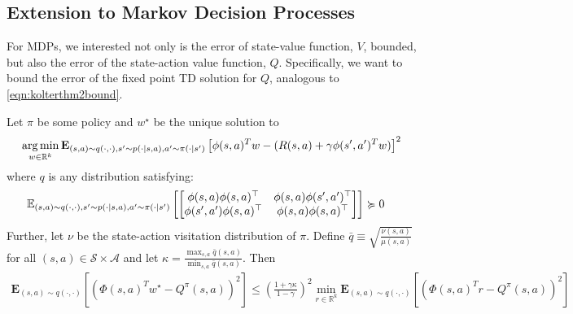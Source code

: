 \subsection{Extension to Markov Decision Processes}
\label{app:pop-q-derivation}
For MDPs, we interested not only is the error of state-value function, $V$, bounded, but also the error of the state-action value function, $Q$.
Specifically, we want to bound the error of the fixed point TD solution for $Q$, analogous to \cref{eqn:kolterthm2bound}.
\begin{lemma}
  Let $\pi$ be some policy and $w^{\star}$ be the unique solution to
  \begin{align}
    \operatorname*{arg\,min}_{w \in \mathbb{R}^k} \mathbf{E}_{(s,a) \sim q(\cdot, \cdot), s' \sim p(\cdot|s,a), a'\sim \pi(\cdot|s')} \left[ \phi(s,a)^T w - (R(s, a) + \gamma \phi(s',a')^T w) \right]^2
  \end{align}
  where $q$ is any distribution satisfying:
  \begin{align}
    \mathbb{E}_{(s, a) \sim q(\cdot, \cdot), s'\sim p(\cdot|s, a), a' \sim \pi(\cdot|s')} & \left[\begin{bmatrix}
                                                                                              \phi(s, a)\phi(s, a)^\top   & \phi(s, a)\phi(s', a')^\top \\
                                                                                              \phi(s', a')\phi(s, a)^\top & \phi(s, a)\phi(s, a)^\top
                                                                                            \end{bmatrix}\right] \succcurlyeq 0 \label{eqn:koldercondstate}
  \end{align}
  Further, let $\nu$ be the state-action visitation distribution of $\pi$.
  Define $\bar{q} \equiv \sqrt{\frac{\nu(s,a)}{\mu(s,a)} }$ for all $(s,a) \in \mathcal{S} \times \mathcal{A}$ and let $\kappa = \frac{\max_{s,a} \bar{q}(s,a)}{\min_{s,a} \bar{q}(s,a)}$.
  Then
  \begin{align}
    \mathbf{E}_{(s,a) \sim q(\cdot, \cdot)} \left [ (\Phi(s,a)^T w^{\star} - Q^\pi(s,a))^2 \right ] \leq \left( \frac{1+\gamma \kappa}{1-\gamma} \right)^2 \min_{r \in \mathbb{R}^k} \mathbf{E}_{(s,a) \sim q(\cdot, \cdot)} \left [ (\Phi(s,a)^T r - Q^\pi(s,a) )^2 \right ]
  \end{align}

\end{lemma}
